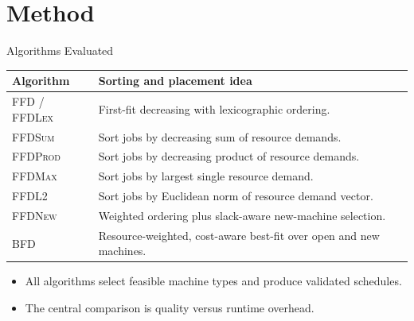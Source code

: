 \documentclass[aspectratio=169,10pt]{beamer}
\newcommand{\alg}[1]{\textsc{#1}}
\begin{document}
\section{Method}

\begin{frame}{Algorithms Evaluated}
  \begin{table}
    \centering
    \scriptsize
    \begin{tabularx}{\textwidth}{@{}lX@{}}
      \toprule
      Algorithm & Sorting and placement idea\\
      \midrule
      \alg{FFD} / \alg{FFDLex} & First-fit decreasing with lexicographic ordering.\\
      \alg{FFDSum} & Sort jobs by decreasing sum of resource demands.\\
      \alg{FFDProd} & Sort jobs by decreasing product of resource demands.\\
      \alg{FFDMax} & Sort jobs by largest single resource demand.\\
      \alg{FFDL2} & Sort jobs by Euclidean norm of resource demand vector.\\
      \alg{FFDNew} & Weighted ordering plus slack-aware new-machine selection.\\
      \alg{BFD} & Resource-weighted, cost-aware best-fit over open and new machines.\\
      \bottomrule
    \end{tabularx}
  \end{table}
  \vspace{0.2cm}
  \begin{itemize}
    \item All algorithms select feasible machine types and produce validated schedules.
    \item The central comparison is quality versus runtime overhead.
  \end{itemize}
\end{frame}
\end{document}
